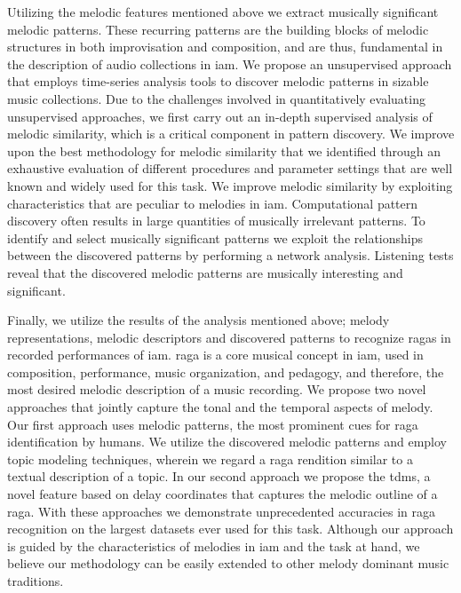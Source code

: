 Utilizing the melodic features mentioned above we extract musically significant melodic patterns. These recurring patterns are the building blocks of melodic structures in both improvisation and composition, and are thus, fundamental in the description of audio collections in \gls{iam}. We propose an unsupervised approach that employs time-series analysis tools to discover melodic patterns in sizable music collections. Due to the challenges involved in quantitatively evaluating unsupervised approaches, we first carry out an in-depth supervised analysis of  melodic similarity, which is a critical component in pattern discovery. We improve upon the best methodology for melodic similarity that we identified through an exhaustive evaluation of different procedures and parameter settings that are well known and widely used for this task. We improve melodic similarity by exploiting characteristics that are peculiar to melodies in \gls{iam}. Computational pattern discovery often results in large quantities of musically irrelevant patterns. To identify and select musically significant patterns we exploit the relationships between the discovered patterns by performing a network analysis. Listening tests reveal that the discovered melodic patterns are musically interesting and significant.

Finally, we utilize the results of the analysis  mentioned above; melody representations, melodic descriptors and discovered patterns to recognize \glspl{raga} in recorded performances of \gls{iam}. \Gls{raga} is a core musical concept in \gls{iam}, used in composition, performance, music organization, and pedagogy, and therefore, the most desired melodic description of a music recording. We propose two novel approaches that jointly capture the tonal and the temporal aspects of melody. Our first approach uses melodic patterns, the most prominent cues for raga identification by humans. We utilize the discovered melodic patterns and employ topic modeling techniques, wherein we regard a \gls{raga} rendition similar to a textual description of a topic. In our second approach we propose the \gls{tdms}, a novel feature based on delay coordinates that captures the melodic outline of a \gls{raga}. With these approaches we demonstrate unprecedented accuracies in \gls{raga} recognition on the largest datasets ever used for this task.  Although our approach is guided by the characteristics of melodies in \gls{iam} and the task at hand, we believe our methodology can be easily extended to other melody dominant music traditions.

